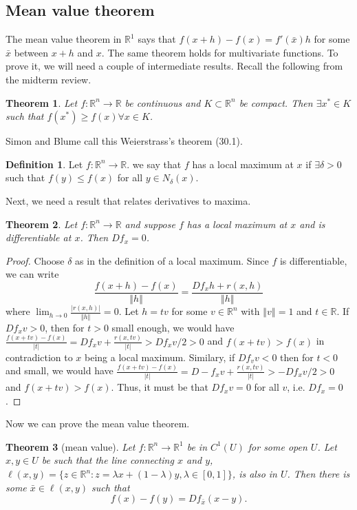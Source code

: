 \documentclass[12pt,reqno]{amsart}
\newtheorem{theorem}{Theorem}[section]
\theoremstyle{definition}
\newtheorem{definition}{Definition}[section]
\def\R{\mathbb{R}}
\newcommand{\norm}[1]{\left\Vert {#1} \right\Vert}
\renewcommand{\to}{{\rightarrow}}
\begin{document}
\subsection{Mean value theorem}

The mean value theorem in $\R^1$ says that $f(x+h) - f(x) =
f'(\bar{x}) h$ for some $\bar{x}$ between $x+h$ and $x$. The same
theorem holds for multivariate functions. To prove it, we will need a
couple of intermediate results. Recall the following from the midterm
review. 
\begin{theorem}
  Let $f:\R^n \to \R$ be continuous and $K \subset \R^n$ be
  compact. Then $\exists x^* \in K$ such that $f(x^*) \geq f(x)
  \forall x \in K$. 
\end{theorem}
Simon and Blume call this Weierstrass's theorem (30.1). 
\begin{definition}
  Let $f: \R^n \to \R$. we say that $f$ has a local maximum at $x$ if
  $\exists \delta > 0$ such that $f(y) \leq f(x)$ for all $y \in
  N_\delta(x)$. 
\end{definition}
Next, we need a result that relates derivatives to maxima. 
\begin{theorem}
  Let $f: \R^n \to \R$ and suppose $f$ has a local maximum at $x$ and
  is differentiable at $x$. Then $Df_x = 0$. 
\end{theorem}
\begin{proof}
  Choose $\delta$ as in the definition of a local maximum. Since $f$
  is differentiable, we can write
  \[ \frac{f(x+h) - f(x)}{\norm{h}} =\frac{ Df_x h +
    r(x,h)}{\norm{h}} \] where $\lim_{h \to 0}
  \frac{|r(x,h)|}{\norm{h}} = 0$. Let $h = t v$ for some $v \in \R^n$
  with $\norm{v} =1$ and $t \in \R$. If $D f_x v > 0$, then for $t>0$
  small enough, we would have $\frac{f(x+tv) - f(x)}{|t|} = D
  f_x v + \frac{r(x,tv)}{|t|} > D
  f_x v / 2 > 0$ and $f(x+tv)> f(x)$ in contradiction to $x$ being a
  local maximum. Similary, if $D f_v v < 0$ then for $t<0$ and small,
  we would have $\frac{f(x+tv) - f(x)}{|t|} = D
  -f_x v + \frac{r(x,tv)}{|t|} > -D
  f_x v / 2 > 0$ and $f(x+tv)> f(x)$. Thus, it must be that $D f_x v =
  0$ for all $v$, i.e. $D f_x = 0$. 
\end{proof}
Now we can prove the mean value theorem.
\begin{theorem}[mean value]\label{thm:mvt}
  Let $f:\R^n \to \R^1$ be in $C^1(U)$ for some open $U$. Let $x, y
  \in U$ be such that the line connecting $x$ and $y$, $\ell(x,y) =
  \{z\in \R^n: z = \lambda x + (1-\lambda) y, \lambda \in [0,1]\}$, is
  also in $U$. Then there is some $\bar{x} \in \ell(x,y)$ such that
  \[ f(x) - f(y) = Df_{\bar{x}} (x-y). \]
\end{theorem}
\end{document}
